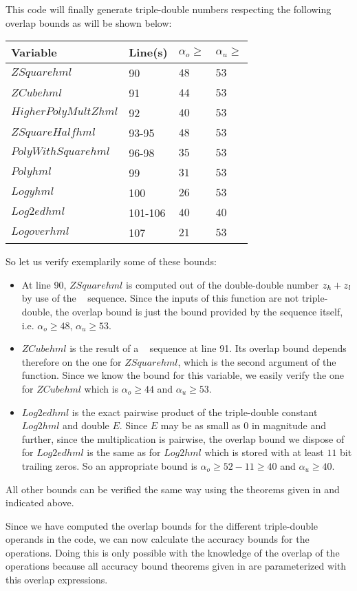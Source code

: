 This code will finally generate triple-double numbers respecting the following overlap bounds as will be
shown below:
\begin{center}
\begin{tabular}{|l|l|l|l|}
\hline
Variable & Line(s) & $\alpha_o \geq$ & $\alpha_u \geq$ \\
\hline
$ZSquarehml$ & 90 & $48$ & $53$ \\
\hline
$ZCubehml$ & 91 & $44$ & $53$ \\
\hline
$HigherPolyMultZhml$ & 92 & $40$ & $53$ \\
\hline 
$ZSquareHalfhml$ & 93-95 & $48$ & $53$ \\
\hline
$PolyWithSquarehml$ & 96-98 & $35$ & $53$ \\
\hline 
$Polyhml$ & 99 & $31$ & $53$ \\
\hline
$Logyhml$ & 100 & $26$ & $53$ \\
\hline
$Log2edhml$ & 101-106 & $40$ & $40$ \\
\hline
$Logoverhml$ & 107 & $21$ & $53$ \\
\hline
\end{tabular}
\end{center}
So let us verify exemplarily some of these bounds: 
\begin{itemize}
\item At line 90, $ZSquarehml$ is computed out of the double-double number $z_{\mathit{h}} + z_{\mathit{l}}$ by use of the \MulDT~ sequence.
Since the inputs of this function are not triple-double, the overlap bound is just the bound provided by the sequence 
itself, i.e. $\alpha_o \geq 48$, $\alpha_u \geq 53$. 
\item $ZCubehml$ is the result of a \MulDTT~ sequence at line 91. Its overlap bound depends therefore on the one
for $ZSquarehml$, which is the second argument of the function. Since we know the bound for this variable, we easily 
verify the one for $ZCubehml$ which is $\alpha_o \geq 44$ and $\alpha_u \geq 53$.
\item $Log2edhml$ is the exact pairwise product of the triple-double constant $Log2hml$ and double $E$. Since $E$ may be
as small as $0$ in magnitude and further, since the multiplication is pairwise, the overlap bound we dispose of for
$Log2edhml$ is the same as for $Log2hml$ which is stored with at least $11$ bit trailing zeros. 
So an appropriate bound is $\alpha_o \geq 52 - 11 \geq 40$ and $\alpha_u \geq 40$. 
\end{itemize}
All other bounds can be verified the same way using the theorems given in \cite{Lauter2005LIP:tripledouble} and indicated above. \par
Since we have computed the overlap bounds for the different triple-double operands in the code, we can now 
calculate the accuracy bounds for the operations. Doing this is only possible with the knowledge of the
overlap of the operations because all accuracy bound theorems given in \cite{Lauter2005LIP:tripledouble} are parameterized with this 
overlap expressions. 


